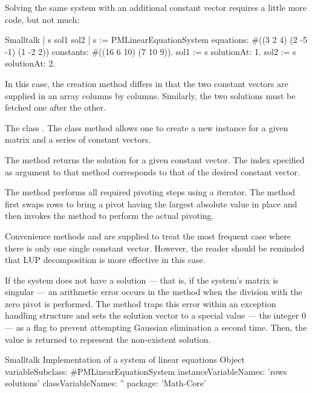 Solving the same system with an additional constant vector
requires a little more code, but not much:
\begin{displaycode}{Smalltalk}
 | s sol1 sol2 |
 s := PMLinearEquationSystem equations: #((3 2 4) (2 -5 -1) (1 -2 2))
                        constants: #((16 6 10)
                                     (7 10 9)).
 sol1 := s solutionAt: 1.
 sol2 := s solutionAt: 2.
\end{displaycode}
In this case, the creation method differs in that the two constant
vectors are supplied in an array columns by columns. Similarly,
the two solutions must be fetched one after the other.

The class .
The class method  allows one to create a new instance for a given
matrix and a series of constant vectors.

The method  returns the solution for a given constant vector.
The index specified as argument to that method corresponds to that of the desired constant vector.

The method  performs all required pivoting steps using
a  iterator. The method  first swaps
rows to bring a pivot having the largest absolute value in place
and then invokes the method  to perform the actual
pivoting.

Convenience methods  and 
are supplied to treat the most frequent case where there is only
one single constant vector.
However, the reader should be reminded that LUP decomposition is more effective in this case.

If the system does not have a solution --- that is, if the
system's matrix is singular --- an arithmetic error occurs in the
method  when the division with the zero pivot is
performed. The method  traps this error within an
exception handling structure and sets the solution vector to a
special value --- the integer 0 --- as a flag to prevent
attempting Gaussian elimination a second time. Then, the value
 is returned to represent the non-existent solution.

\begin{listing}[label=lst:lineqs]{Smalltalk}
{Implementation of a system of linear equations}
Object variableSubclass: #PMLinearEquationSystem
   instanceVariableNames: 'rows solutions'
   classVariableNames: ''
   package: 'Math-Core'
\end{listing}

